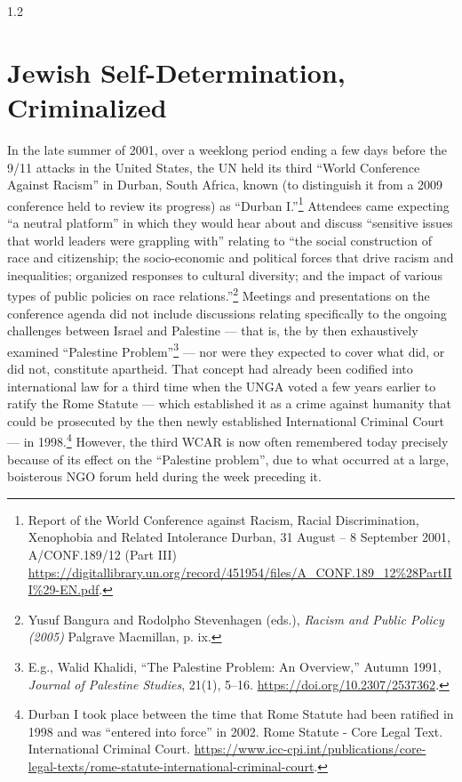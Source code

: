 \documentclass[../unravbook.tex]{subfiles}
\begin{document}
\begin{spacing}{1.2}

\setcounter{chapter}{2}
\setcounter{endnote}{0}

\chapter{Jewish Self-Determination, Criminalized} %
    

In the late summer of 2001, over a weeklong period ending a few days before the 9/11 attacks in the United States, the UN held its third \enquote{World Conference Against Racism} in Durban, South Africa, known (to distinguish it from a 2009 conference held to review its progress) as \enquote{Durban I.}\footnote{Report of the World Conference against Racism, Racial Discrimination, Xenophobia and Related Intolerance Durban, 31 August -- 8 September 2001, A/CONF.189/12 (Part III) \url{https://digitallibrary.un.org/record/451954/files/A_CONF.189_12\%28PartIII\%29-EN.pdf}.} Attendees came expecting ``a neutral platform'' in which they would hear about and discuss \enquote{sensitive issues that world leaders were grappling with} relating to ``the social construction of race and citizenship; the socio-economic and political forces that drive racism and inequalities; organized responses to cultural diversity; and the impact of various types of public policies on race relations.''\footnote{Yusuf Bangura and Rodolpho Stevenhagen (eds.), \textit{Racism and Public Policy (2005)} Palgrave Macmillan, p. ix.} Meetings and presentations on the conference agenda did not include discussions relating specifically to the ongoing challenges between Israel and Palestine --- that is, the by then exhaustively examined ``Palestine Problem''\footnote{E.g., Walid Khalidi, ``The Palestine Problem: An Overview,'' Autumn 1991, \textit{Journal of Palestine Studies}, 21(1), 5--16. \url{https://doi.org/10.2307/2537362}.} --- nor were they expected to cover what did, or did not, constitute apartheid. That concept had already been codified into international law for a third time when the UNGA voted a few years earlier to ratify the Rome Statute --- which established it as a crime against humanity that could be prosecuted by the then newly established International Criminal Court --- in 1998.\footnote{Durban I took place between the time that Rome Statute had been ratified in 1998 and was ``entered into force'' in 2002. Rome Statute  - Core Legal Text. International Criminal Court. \url{https://www.icc-cpi.int/publications/core-legal-texts/rome-statute-international-criminal-court}.} However, the third WCAR is now often remembered today precisely because of its effect on the \enquote{Palestine problem}, due to what occurred at a large, boisterous NGO forum held during the week preceding it. 


\end{spacing}
\end{document}
